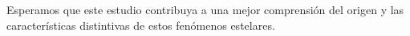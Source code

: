 \documentclass[baaa]{baaa}
\newcommand{\michu}[1]{\textcolor{purple}{#1}}
\begin{document}
Esperamos que este estudio contribuya a una mejor comprensión del origen y las características distintivas de estos fenómenos estelares.   %



                                                                   
\end{document}
